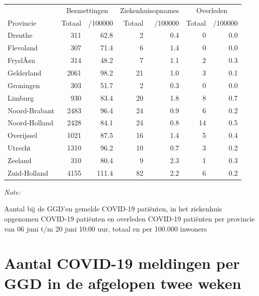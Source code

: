 \documentclass[
  english,
  man,floatsintext]{apa6}
\begin{document}
\begin{table}
\centering
\begin{threeparttable}
\begin{tabular}{lrrrrrr}
\toprule
\multicolumn{1}{c}{ } & \multicolumn{2}{c}{Besmettingen} & \multicolumn{2}{c}{Ziekenhuisopnames} & \multicolumn{2}{c}{Overleden} \\
\cmidrule(l{3pt}r{3pt}){2-3} \cmidrule(l{3pt}r{3pt}){4-5} \cmidrule(l{3pt}r{3pt}){6-7}
Provincie & Totaal & /100000 & Totaal & /100000 & Totaal & /100000\\
\midrule
Drenthe & 311 & 62.8 & 2 & 0.4 & 0 & 0.0\\
Flevoland & 307 & 71.4 & 6 & 1.4 & 0 & 0.0\\
FryslÃ¢n & 314 & 48.2 & 7 & 1.1 & 2 & 0.3\\
Gelderland & 2061 & 98.2 & 21 & 1.0 & 3 & 0.1\\
Groningen & 303 & 51.7 & 2 & 0.3 & 0 & 0.0\\
Limburg & 930 & 83.4 & 20 & 1.8 & 8 & 0.7\\
Noord-Brabant & 2483 & 96.4 & 24 & 0.9 & 6 & 0.2\\
Noord-Holland & 2428 & 84.1 & 24 & 0.8 & 14 & 0.5\\
Overijssel & 1021 & 87.5 & 16 & 1.4 & 5 & 0.4\\
Utrecht & 1310 & 96.2 & 10 & 0.7 & 3 & 0.2\\
Zeeland & 310 & 80.4 & 9 & 2.3 & 1 & 0.3\\
Zuid-Holland & 4155 & 111.4 & 82 & 2.2 & 6 & 0.2\\
\bottomrule
\end{tabular}
\begin{tablenotes}
\item \textit{Note: } 
\item Aantal bij de GGD’en gemelde COVID-19 patiënten, in het ziekenhuis opgenomen COVID-19 patiënten en overleden COVID-19 patiënten per provincie van 06 juni t/m 20 juni 10:00 uur, totaal en per 100.000 inwoners
\end{tablenotes}
\end{threeparttable}
\end{table}

\newpage

\hypertarget{aantal-covid-19-meldingen-per-ggd-in-de-afgelopen-twee-weken}{%
\section{Aantal COVID-19 meldingen per GGD in de afgelopen twee weken}\label{aantal-covid-19-meldingen-per-ggd-in-de-afgelopen-twee-weken}}
\end{document}
